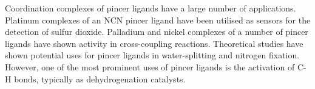 Coordination complexes of pincer ligands have a large number of applications.  Platinum complexes of an NCN pincer ligand have been utilised as sensors for the detection of sulfur dioxide.\cite{Albrecht2000, Albrecht2000c, Albrecht2001}  Palladium and nickel complexes of a number of pincer ligands have shown activity in cross-coupling reactions.\cite{Hahn2007, Bedford2000, Kimura2006, Zim2000, Obora2006} Theoretical studies have shown potential uses for pincer ligands in water-splitting\cite{Sandhya2011} and nitrogen fixation.\cite{Holscher2007}  However, one of the most prominent uses of pincer ligands is the activation of C-H bonds, typically as dehydrogenation catalysts.\cite{Choi2011, Albrecht2001, Crabtree2001}





